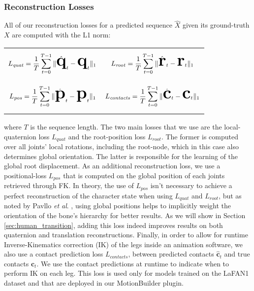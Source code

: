 \documentclass[acmtog]{acmart}
\newcommand{\bp}{\textbf{p}}
\newcommand{\bc}{\textbf{c}}
\newcommand{\bq}{\textbf{q}}
\newcommand{\br}{\textbf{r}}
\newcommand{\etal}{\textit{et al}. }
\begin{document}
\subsubsection{Reconstruction Losses}
All of our reconstruction losses for a predicted sequence $\hat{X}$ given its ground-truth $X$ are computed with the L1 norm:
\begin{table}[H]
     \begin{adjustbox}{width=\columnwidth,center}
         \begin{tabular}{c c}
                 \vbox{\begin{equation} \Huge L_{\mathit{quat}} = \frac{1}{T} \sum^{T-1}_{t=0} \|\hat{\bq}_{t} - \bq_{t}\|_1 \end{equation}}
                 & \vbox{\begin{equation} \Huge L_{\mathit{root}} = \frac{1}{T} \sum^{T-1}_{t=0} \|\hat{\br}_{t} - \br_{t}\|_1 \end{equation}} \\
                
                 \vbox{\begin{equation} \Huge L_{\mathit{pos}} = \frac{1}{T} \sum^{T-1}_{t=0} \|\hat{\bp}_{t} - \bp_{t}\|_1 \end{equation}}
                 & \vbox{\begin{equation} \Huge L_{\mathit{contacts}} = \frac{1}{T} \sum^{T-1}_{t=0} \|\hat{\bc}_{t} - \bc_{t}\|_1 \end{equation}}
         \end{tabular}
     \end{adjustbox}
     \vskip -0.25cm
 \end{table}
where $T$ is the sequence length. The two main losses that we use are the local-quaternion loss $L_{\mathit{quat}}$ and the root-position loss $L_{\mathit{root}}$. The former is computed over all joints' local rotations, including the root-node, which in this case also determines global orientation. The latter is responsible for the learning of the global root displacement. As an additional reconstruction loss, we use a positional-loss $L_{\mathit{pos}}$ that is computed on the global position of each joints retrieved through FK. In theory, the use of $L_{\mathit{pos}}$ isn't necessary to achieve a perfect reconstruction of the character state when using $L_{\mathit{quat}}$ and $L_{\mathit{root}}$, but as noted by Pavllo \etal {}, using global positions helps to implicitly weight the orientation of the bone's hierarchy for better results. As we will show in Section \ref{sec:human_transition}, adding this loss indeed improves results on both quaternion and translation reconstructions. Finally, in order to allow for runtime Inverse-Kinematics correction (IK) of the legs inside an animation software, we also use a contact prediction loss $L_{\mathit{contacts}}$, between predicted contacts $\hat{\bc}_t$ and true contacts $\bc_t$. We use the contact predictions at runtime to indicate when to perform IK on each leg. This loss is used only for models trained on the LaFAN1 dataset and that are deployed in our MotionBuilder plugin. 
\end{document}

